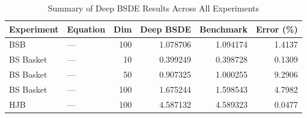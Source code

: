\begin{table}[htbp]
\centering
\caption{Summary of Deep BSDE Results Across All Experiments}
\label{tab:summary}
\begin{tabular}{@{}llrrrr@{}}
\toprule
\textbf{Experiment} & \textbf{Equation} & \textbf{Dim} & \textbf{Deep BSDE} & \textbf{Benchmark} & \textbf{Error (\%)} \\
\midrule
BSB & --- & 100 & 1.078706 & 1.094174 & 1.4137 \\
BS Basket & --- & 10 & 0.399249 & 0.398728 & 0.1309 \\
BS Basket & --- & 50 & 0.907325 & 1.000255 & 9.2906 \\
BS Basket & --- & 100 & 1.675244 & 1.598543 & 4.7982 \\
HJB & --- & 100 & 4.587132 & 4.589323 & 0.0477 \\
\bottomrule
\end{tabular}
\end{table}
